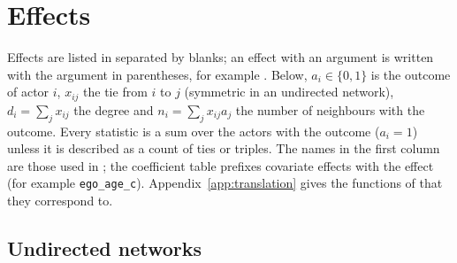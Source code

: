 \chapter{Effects}\label{ch:effects}

Effects are listed in  separated by blanks; an effect with an argument is written with the argument in parentheses, for example . Below, $a_i\in\{0,1\}$ is the outcome of actor $i$, $x_{ij}$ the tie from $i$ to $j$ (symmetric in an undirected network), $d_i=\sum_j x_{ij}$ the degree and $n_i=\sum_j x_{ij}a_j$ the number of neighbours with the outcome. Every statistic is a sum over the actors with the outcome ($a_i=1$) unless it is described as a count of ties or triples. The names in the first column are those used in ; the coefficient table prefixes covariate effects with the effect (for example \texttt{ego\_age\_c}). Appendix~\ref{app:translation} gives the functions of \alaamee{} that they correspond to.

\section{Undirected networks}\label{sec:eff-undirected}

